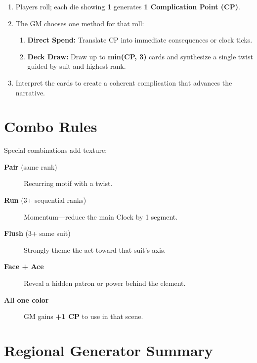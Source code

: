 \begin{enumerate}
\item Players roll; each die showing \textbf{1} generates \textbf{1 Complication Point (CP)}. 
\item The GM chooses one method for that roll:
\begin{enumerate}
    \item \textbf{Direct Spend:} Translate CP into immediate consequences or clock ticks.
    \item \textbf{Deck Draw:} Draw up to \textbf{min(CP, 3)} cards and synthesize a single twist guided by suit and highest rank.
\end{enumerate}
\item Interpret the cards to create a coherent complication that advances the narrative.
\end{enumerate}

\section{Combo Rules}
\label{sec:combo-rules}

Special combinations add texture:
\begin{description}
\item[\textbf{Pair} (same rank)] Recurring motif with a twist. 
\item[\textbf{Run} (3+ sequential ranks)] Momentum—reduce the main Clock by 1 segment. 
\item[\textbf{Flush} (3+ same suit)] Strongly theme the act toward that suit's axis. 
\item[\textbf{Face + Ace}] Reveal a hidden patron or power behind the element. 
\item[\textbf{All one color}] GM gains \textbf{+1 CP} to use in that scene. 
\end{description}

\section{Regional Generator Summary}
\label{sec:regional-summary}

